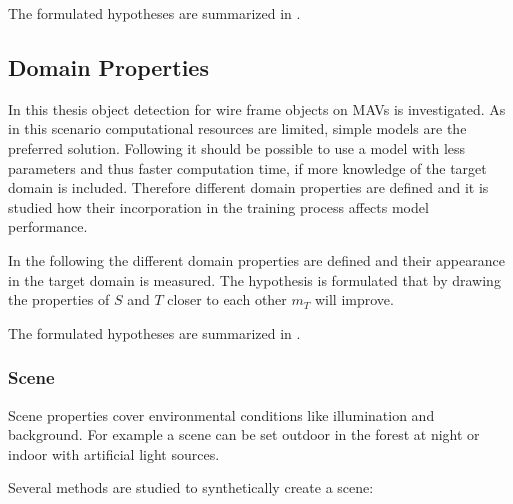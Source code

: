 The formulated hypotheses are summarized in .

\subsection{Domain Properties}

In this thesis object detection for wire frame objects on \acp{MAV} is investigated. As in this scenario computational resources are limited, simple models are the preferred solution. Following  it should be possible to use a model with less parameters and thus faster computation time, if more knowledge of the target domain is included. Therefore different domain properties are defined and it is studied how their incorporation in the training process affects model performance.

In the following the different domain properties are defined and their appearance in the target domain is measured. The hypothesis is formulated that by drawing the properties of $S$ and $T$ closer to each other $m_T$ will improve.

The formulated hypotheses are summarized in .

\subsubsection{Scene}

Scene properties cover environmental conditions like illumination and background. For example a scene can be set outdoor in the forest at night or indoor with artificial light sources.

Several methods are studied to synthetically create a scene:

